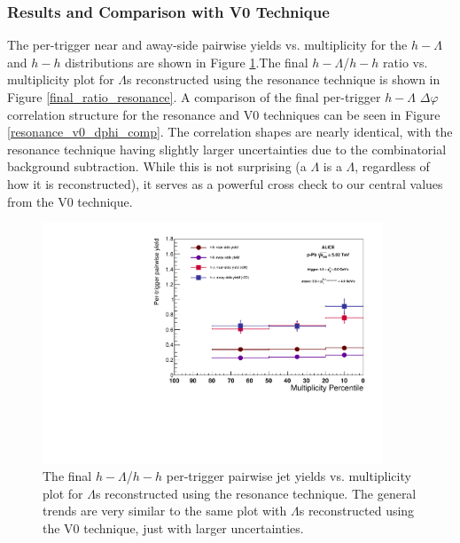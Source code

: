\documentclass[ALICE,manyauthors]{ALICE_analysis_notes}
\begin{document}
\clearpage


\subsubsection{Results and Comparison with V0 Technique}
The per-trigger near and away-side pairwise yields vs. multiplicity for the $h-\Lambda$ and $h-h$ distributions are shown in Figure \ref{final_pairwise_yields_resonance}.The final $h-\Lambda$/$h-h$ ratio vs. multiplicity plot for $\Lambda$s reconstructed using the resonance technique is shown in Figure \ref{final_ratio_resonance}. A comparison of the final per-trigger $h-\Lambda$ $\Delta\varphi$ correlation structure for the resonance and V0 techniques can be seen in Figure \ref{resonance_v0_dphi_comp}. The correlation shapes are nearly identical, with the resonance technique having slightly larger uncertainties due to the combinatorial background subtraction. While this is not surprising (a $\Lambda$ is a $\Lambda$, regardless of how it is reconstructed), it serves as a powerful cross check to our central values from the V0 technique.

\begin{figure}[ht]
\centering
\includegraphics[width=4in]{figures/pairwise_plot_resonance.pdf}
\caption{The final $h-\Lambda$/$h-h$ per-trigger pairwise jet yields vs. multiplicity plot for $\Lambda$s reconstructed using the resonance technique. The general trends are very similar to the same plot with $\Lambda$s reconstructed using the V0 technique, just with larger uncertainties.}
\label{final_pairwise_yields_resonance}
\end{figure}
\end{document}
